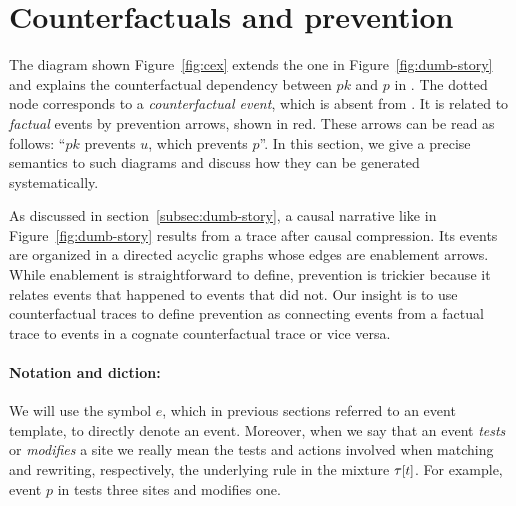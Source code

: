 
\section{Counterfactuals and prevention}\label{sec:inhibition}




The diagram shown Figure~\ref{fig:cex} extends the one in
Figure~\ref{fig:dumb-story} and explains the counterfactual dependency
between $pk$ and $p$ in \RefTrace{}. The dotted node corresponds to a
\emph{counterfactual event}, which is absent from \RefTrace{}. It is
related to \emph{factual} events by prevention arrows, shown in
red. These arrows can be read as follows: ``$pk$ prevents $u$, which
prevents $p$''. In this section, we give a precise semantics to such
diagrams and discuss how they can be generated systematically.

As discussed in section~\ref{subsec:dumb-story}, a causal narrative like
in Figure~\ref{fig:dumb-story} results from a trace after causal
compression.  Its events are organized in a directed acyclic graphs whose edges
are enablement arrows. While enablement is straightforward to define, prevention
is trickier because it relates events that happened to events that did not. Our
insight is to use counterfactual traces to define prevention as connecting
events from a factual trace to events in a cognate counterfactual trace or vice
versa.


\ifshort \vspace{-0.4cm} \else \vspace{-0.3cm} \fi

\paragraph{Notation and diction:} We will use the symbol $e$, which in previous
sections referred to an event template, to directly denote an event. Moreover, when we say that an event \emph{tests} or \emph{modifies} a site we really mean the tests and actions involved when matching and rewriting, respectively, the underlying rule in the mixture $\TSTATE{t}{\tau}$. For example, event $p$ in \RefTrace{} tests three sites and modifies one.

